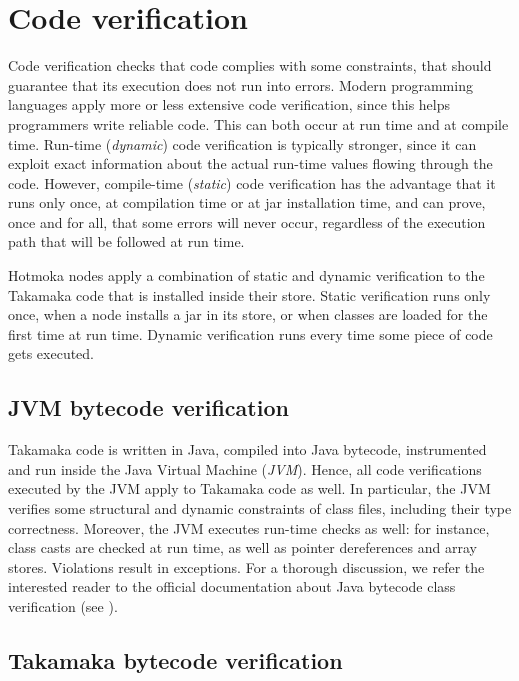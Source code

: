 \chapter{Code verification}\label{ch:code_verification}

Code verification checks that code complies with some constraints, that should
guarantee that its execution does not run into errors. Modern programming
languages apply more or less extensive code verification, since this helps
programmers write reliable code. This can both occur at run time and at compile
time. Run-time (\emph{dynamic}) code verification is typically stronger, since it can exploit
exact information about the actual run-time values flowing through the code. However,
compile-time (\emph{static}) code verification has the advantage that it runs only
once, at compilation time or at jar installation time, and can prove, once and for all,
that some errors will never occur, regardless of the execution path that will
be followed at run time.

Hotmoka nodes apply a combination of static and dynamic verification to the
Takamaka code that is installed inside their store.
Static verification runs only once, when a node installs
a jar in its store, or when classes are loaded for the first time at run time.
Dynamic verification runs every time some piece of code gets executed.

\section{JVM bytecode verification}\label{subsec:jvm_bytecode_verification}

Takamaka code is written in Java, compiled into Java bytecode, instrumented
and run inside the Java Virtual Machine (\emph{JVM}). Hence, all code verifications
executed by the JVM apply to Takamaka code as well. In particular, the JVM verifies
some structural and dynamic constraints of class files, including their
type correctness.
Moreover, the JVM executes run-time checks as well: for instance, class casts
are checked at run time, as well as pointer dereferences and
array stores. Violations result in exceptions. For a thorough discussion,
we refer the interested
reader to the official documentation about Java bytecode class
verification (see ).

\section{Takamaka bytecode verification}\label{subsec:takamaka_bytecode_verification}

